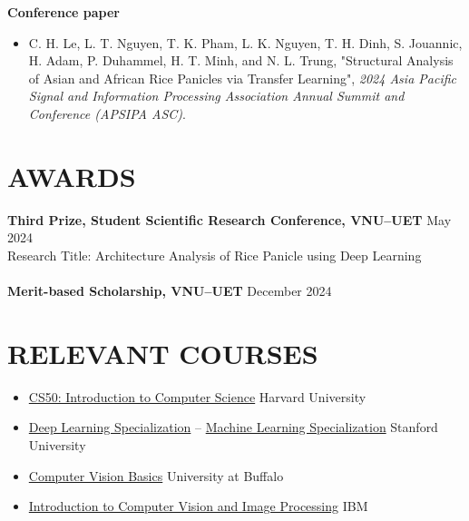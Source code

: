 \documentclass[a4paper,9pt]{extarticle}
\newcommand{\colormyname}[1]{\textcolor{myred}{#1}}
\begin{document}
\noindent
\textbf{Conference paper}
\begin{itemize}
    \item C. H. Le, \colormyname{L. T. Nguyen}, T. K. Pham, L. K. Nguyen, T. H. Dinh, S. Jouannic, H. Adam, P. Duhammel, H. T. Minh, and N. L. Trung, "Structural Analysis of Asian and African Rice Panicles via Transfer Learning", \textit{2024 Asia Pacific Signal and Information Processing Association Annual Summit and Conference (APSIPA ASC)}.
\end{itemize}

\section*{AWARDS}
\textbf{Third Prize, Student Scientific Research Conference, VNU--UET} \hfill May 2024\\ 
Research Title: Architecture Analysis of Rice Panicle using Deep Learning \\ \\
\textbf{Merit-based Scholarship, VNU--UET} \hfill  December 2024 

\section*{RELEVANT COURSES}
\begin{itemize}
    \item \href{https://certificates.cs50.io/3f3f35e9-bda6-4487-84a3-2d11b3706bba.pdf?size=letter}{CS50: Introduction to Computer Science} \hfill Harvard University
    \item \href{https://www.credly.com/badges/6dfef240-b0c0-423f-9c94-897d0940c790/public_url}{Deep Learning Specialization} -- \href{https://www.coursera.org/account/accomplishments/specialization/N234W2TA9VF3}{Machine Learning Specialization} \hfill Stanford University
    \item \href{https://www.coursera.org/account/accomplishments/certificate/L9TKVLPXS79W}{Computer Vision Basics} \hfill University at Buffalo
    \item \href{https://www.credly.com/go/GHFkiYLI}{Introduction to Computer Vision and Image Processing} \hfill IBM
\end{itemize}
\end{document}
